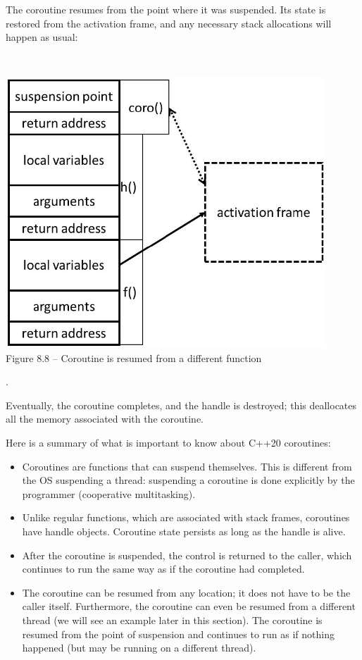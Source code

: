 The coroutine resumes from the point where it was suspended. Its state is restored from  the activation frame, and any necessary stack allocations will happen as usual:

\hspace*{\fill} \\ %
\begin{center}
\includegraphics[width=0.9\textwidth]{content/2/chapter8/images/8.jpg}\\
Figure 8.8 – Coroutine is resumed from a different function
\end{center}.

Eventually, the coroutine completes, and the handle is destroyed; this deallocates all the memory associated with the coroutine.

Here is a summary of what is important to know about C++20 coroutines:

\begin{itemize}
\item
Coroutines are functions that can suspend themselves. This is different from the OS suspending a thread: suspending a coroutine is done explicitly by the programmer (cooperative multitasking).

\item
Unlike regular functions, which are associated with stack frames, coroutines have handle objects. Coroutine state persists as long as the handle is alive.

\item
After the coroutine is suspended, the control is returned to the caller, which continues to run the same way as if the coroutine had completed. 


\item 
The coroutine can be resumed from any location; it does not have to be the caller itself. Furthermore, the coroutine can even be resumed from a different thread (we will see an example later in this section). The coroutine is resumed from the point of suspension and continues to run as if nothing happened (but may be running on a different thread).
\end{itemize}


